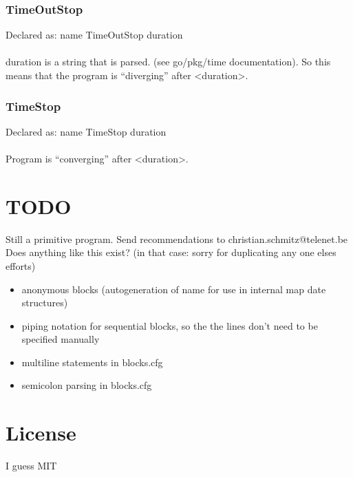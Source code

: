 \documentclass[a4paper]{article}
\begin{document}
\subsubsection{TimeOutStop}
Declared as: name TimeOutStop duration\\\\
duration is a string that is parsed. (see go/pkg/time documentation). So this means that the program is ``diverging'' after <duration>.
\subsubsection{TimeStop}
Declared as: name TimeStop duration\\\\
Program is ``converging'' after <duration>.
\section{TODO}
Still a primitive program. Send recommendations to christian.schmitz@telenet.be
Does anything like this exist? (in that case: sorry for duplicating any one elses efforts)
\begin{itemize}
  \item anonymous blocks (autogeneration of name for use in internal map date structures)
  \item piping notation for sequential blocks, so the the lines don't need to be specified manually
  \item multiline statements in blocks.cfg
  \item semicolon parsing in blocks.cfg
\end{itemize}
\section{License}
I guess MIT
\end{document}
